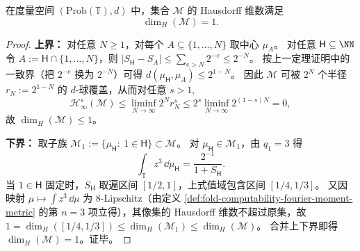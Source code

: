 \begin{theorem}\label{thm:fold-computability-halting-spectrum-measure-image-hausdorff-dim}
在度量空间 \((\mathrm{Prob}(\mathbb T),d)\) 中，集合 \(\mathcal M\) 的 Hausdorff 维数满足
\[
\dim_H(\mathcal M)=1.
\]
\end{theorem}
\begin{proof}
\textbf{上界：}
对任意 \(N\ge 1\)，对每个 \(A\subseteq\{1,\dots,N\}\) 取中心 \(\mu_A\)。
对任意 \(\mathsf H\subseteq\NN\) 令 \(A:=\mathsf H\cap\{1,\dots,N\}\)，则 \(|S_{\mathsf H}-S_A|\le \sum_{e>N}2^{-e}\le 2^{-N}\)。
按上一定理证明中的一致界（把 \(2^{-e}\) 换为 \(2^{-N}\)）可得
\(
d(\mu_{\mathsf H},\mu_A)\le 2^{1-N}
\)。
因此 \(\mathcal M\) 可被 \(2^N\) 个半径 \(r_N:=2^{1-N}\) 的 \(d\)-球覆盖，从而对任意 \(s>1\),
\[
\mathscr{H}^s_\infty(\mathcal M)
\le \liminf_{N\to\infty}2^N r_N^s
\le 2^s\liminf_{N\to\infty}2^{(1-s)N}
=0,
\]
故 \(\dim_H(\mathcal M)\le 1\)。
\par
\textbf{下界：}
取子族 \(\mathcal M_1:=\{\mu_{\mathsf H}:\ 1\in\mathsf H\}\subset\mathcal M\)。
对 \(\mu_{\mathsf H}\in\mathcal M_1\)，由 \(q_1=3\) 得
\[
\int_{\mathbb T}z^{3}\,\dd\mu_{\mathsf H}=\frac{2^{-1}}{1+S_{\mathsf H}}.
\]
当 \(1\in\mathsf H\) 固定时，\(S_{\mathsf H}\) 取遍区间 \([1/2,1]\)，上式值域包含区间 \([1/4,1/3]\)。
又因映射 \(\mu\mapsto \int z^3\,\dd\mu\) 为 \(8\)-Lipschitz（由定义 \ref{def:fold-computability-fourier-moment-metric} 的第 \(n=3\) 项立得），其像集的 Hausdorff 维数不超过原集，故
\(
1=\dim_H([1/4,1/3])\le \dim_H(\mathcal M_1)\le \dim_H(\mathcal M)
\)。
合并上下界即得 \(\dim_H(\mathcal M)=1\)。证毕。
\end{proof}


